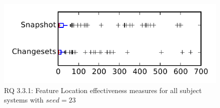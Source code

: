 
\begin{figure}
\centering
\includegraphics[height=0.4\textheight]{figures/flt_seed/rq1_tiny_23}
\caption{RQ 3.3.1: Feature Location effectiveness measures for all subject systems with $seed=23$}
\label{fig:flt_seed:rq1:tiny}
\end{figure}
